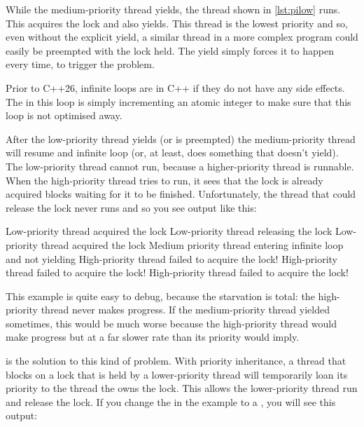 While the medium-priority thread yields, the thread shown in \ref{lst:pilow} runs.
This acquires the lock and also yields.
This thread is the lowest priority and so, even without the explicit yield, a similar thread in a more complex program could easily be preempted with the lock held.
The yield simply forces it to happen every time, to trigger the problem.

\begin{note}
	Prior to C++26, infinite loops are  in C++ if they do not have any side effects.
	The  in this loop is simply incrementing an atomic integer to make sure that this loop is not optimised away.
\end{note}

\codelisting[filename=examples/priority_inheritance/priority_inheritance.cc,marker=low,label=lst:pilow,caption="A low-priority thread that will be preempted with a lock held"]{}

After the low-priority thread yields (or is preempted) the medium-priority thread will resume and infinite loop (or, at least, does something that doesn't yield).
The low-priority thread cannot run, because a higher-priority thread is runnable.
When the high-priority thread tries to run, it sees that the lock is already acquired blocks waiting for it to be finished.
Unfortunately, the thread that could release the lock never runs and so you see output like this:

\begin{console}
Low-priority thread acquired the lock
Low-priority thread releasing the lock
Low-priority thread acquired the lock
Medium priority thread entering infinite loop and not yielding
High-priority thread failed to acquire the lock!
High-priority thread failed to acquire the lock!
High-priority thread failed to acquire the lock!
\end{console}

This example is quite easy to debug, because the starvation is total: the high-priority thread never makes progress.
If the medium-priority thread yielded sometimes, this would be much worse because the high-priority thread would make progress but at a far slower rate than its priority would imply.

 is the solution to this kind of problem.
With priority inheritance, a thread that blocks on a lock that is held by a lower-priority thread will temporarily loan its priority to the thread the owns the lock.
This allows the lower-priority thread run and release the lock.
If you change the  in the example to a , you will see this output:

